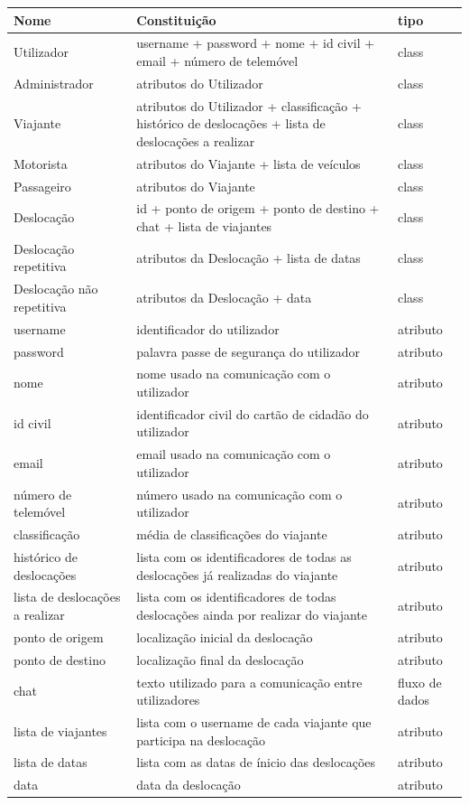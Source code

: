 \begin{center}
\begin{tabular}{ | m{7em} | m{10cm}| m{4em} | } 
\hline
Nome & Constituição & tipo \\ 
\hline
Utilizador & username + password + nome + id civil + email + número de telemóvel & class \\ 
\hline
Administrador & atributos do Utilizador & class \\ 
\hline
Viajante & atributos do Utilizador + classificação + histórico de deslocações + lista de deslocações a realizar & class \\ 
\hline
Motorista & atributos do Viajante + lista de veículos & class \\
\hline
Passageiro & atributos do Viajante & class \\
\hline
Deslocação & id + ponto de origem + ponto de destino + chat + lista de viajantes & class \\
\hline
Deslocação repetitiva & atributos da Deslocação + lista de datas & class \\
\hline
Deslocação não repetitiva & atributos da Deslocação + data & class \\
\hline
username & identificador do utilizador & atributo \\
\hline
password & palavra passe de segurança do utilizador & atributo \\
\hline
nome & nome usado na comunicação com o utilizador & atributo \\
\hline
id civil & identificador civil do cartão de cidadão do utilizador & atributo \\
\hline
email & email usado na comunicação com o utilizador & atributo \\
\hline
número de telemóvel & número usado na comunicação com o utilizador & atributo \\
\hline
classificação & média de classificações do viajante & atributo \\
\hline
histórico de deslocações & lista com os identificadores de todas as deslocações já realizadas do viajante & atributo \\
\hline
lista de deslocações a realizar & lista com os identificadores de todas deslocações ainda por realizar do viajante & atributo \\
\hline
ponto de origem & localização inicial da deslocação & atributo \\
\hline
ponto de destino & localização final da deslocação & atributo \\
\hline
chat & texto utilizado para a comunicação entre utilizadores & fluxo de dados \\
\hline
lista de viajantes & lista com o username de cada viajante que participa na deslocação & atributo \\
\hline
lista de datas & lista com as datas de ínicio das deslocações & atributo \\
\hline
data & data da deslocação & atributo \\
\hline
\end{tabular}
\end{center}